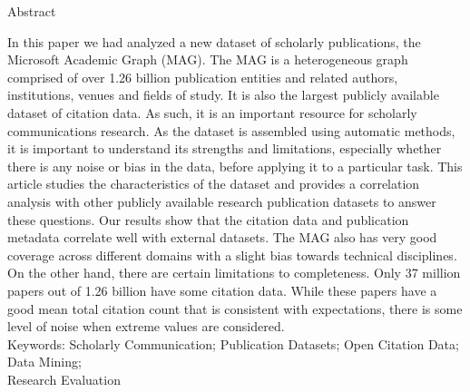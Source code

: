 


\noindent
\begin{center}
\huge Abstract
\end{center}

\noindent
In this paper we had analyzed a new dataset of scholarly publications, the Microsoft Academic Graph (MAG). The MAG is a heterogeneous graph comprised of over 1.26 billion publication entities and related authors, institutions, venues and fields of study. It is also the largest publicly available dataset of citation data. As such, it is an important resource for scholarly communications research. As the dataset is assembled using automatic methods, it is important to understand its strengths and limitations, especially whether there is any noise or bias in the data, before applying it to a particular task. This article studies the characteristics of the dataset and provides a correlation analysis with other publicly available research publication datasets to answer these questions. Our results show that the citation data and publication metadata correlate well with external datasets. The MAG also has very good coverage across different domains with a slight bias towards technical disciplines. On the other hand, there are certain limitations to completeness. Only 37 million papers out of 1.26 billion have some citation data. While these papers have a good mean total citation count that is consistent with expectations, there is some level of noise when extreme values are considered.\\
Keywords: Scholarly Communication; Publication Datasets; Open Citation Data; Data Mining;\\
Research Evaluation